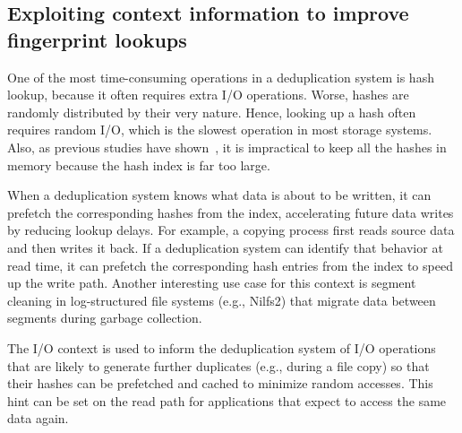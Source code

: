 \subsection{Exploiting context information to improve fingerprint lookups}
One of the most time-consuming operations
in a deduplication system is hash lookup, because it often
requires extra I/O operations. Worse, hashes are randomly
distributed by their very nature. Hence, looking
up a hash often requires random I/O, which is the slowest
operation in most storage systems. Also, as previous
studies have shown~\cite{diskbottleneck}, it is impractical to keep all the
hashes in memory because the hash index is far too large.

When a deduplication system knows
what data is about to be written, it can prefetch the corresponding
hashes from the index, accelerating future
data writes by reducing lookup delays. For example, a
copying process first reads source data and then writes it
back. If a deduplication system can identify that behavior
at read time, it can prefetch the corresponding hash
entries from the index to speed up the write path. Another
interesting use case for this context is segment cleaning
in log-structured file systems (e.g., Nilfs2) that migrate
data between segments during garbage collection.

The I/O context is used to inform the deduplication
system of I/O operations that are likely to generate
further duplicates (e.g., during a file copy) so that
their hashes can be prefetched and cached to minimize
random accesses. This hint can be set on the read
path for applications that expect to access the same data
again. 

